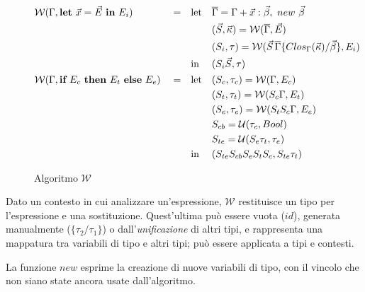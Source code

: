 \begin{figure}
\[\begin{aligned}
\begin{aligned}[t]
            \end{aligned}
            \\
            \algWline{\Gamma}{\textbf{let}\ \vec{x} = \vec{E}\ \textbf{in}\ E_i}
            \begin{aligned}[t]
                 & \text{let} &  & \overline{\Gamma} = \Gamma + \vec{x} : \vec{\beta},\ new\ \vec{\beta}                              \\
                 &            &  & (\vec{S}, \vec{\kappa}) = \algW{\overline{\Gamma}}{\vec{E}}                                        \\
                 &            &  & (S_i, \tau) = \algW{\vec{S}\,\overline{\Gamma} \{Clos_{\Gamma}(\vec{\kappa}) / \vec{\beta}\}}{E_i} \\
                 & \text{in}  &  & (S_i \vec{S}, \tau)
            \end{aligned}
            \\
            \algWline{\Gamma}{\textbf{if}\ E_c\ \textbf{then}\ E_t\ \textbf{else}\ E_e}
            \begin{aligned}[t]
                 & \text{let} &  & (S_c, \tau_c) = \algW{\Gamma}{E_c}         \\
                 &            &  & (S_t, \tau_t) = \algW{S_c \Gamma}{E_t}     \\
                 &            &  & (S_e, \tau_e) = \algW{S_t S_c \Gamma}{E_e} \\
                 &            &  & S_{cb} = \mathcal{U}(\tau_c, Bool)         \\
                 &            &  & S_{te} = \mathcal{U}(S_e \tau_t, \tau_e)   \\
                 & \text{in}  &  & (S_{te} S_{cb} S_e S_t S_c, S_{te} \tau_t)
            \end{aligned}
        \end{aligned}
    \]
    \caption{Algoritmo $\mathcal{W}$}
    \label{fig:3-algorithm-w}
    \vspace{4mm}
\end{figure}

\noindent Dato un contesto in cui analizzare un'espressione, $\mathcal{W}$ restituisce un tipo per l'espressione e una sostituzione.
Quest'ultima può essere vuota ($id$), generata manualmente ($\{\tau_2 / \tau_1\}$) o dall'\textit{unificazione} di altri tipi,
e rappresenta una mappatura tra variabili di tipo e altri tipi; può essere applicata a tipi e contesti.

\noindent La funzione $new$ esprime la creazione di nuove variabili di tipo, con il vincolo che non siano state ancora usate dall'algoritmo.

